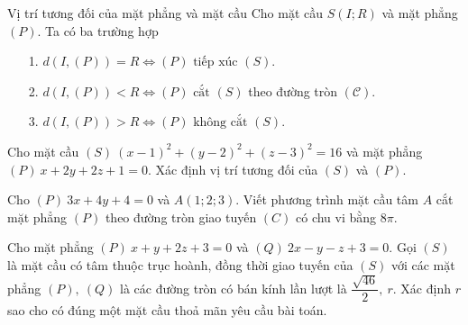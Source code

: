 \begin{dang}{Vị trí tương đối của mặt phẳng và mặt cầu}
	Cho mặt cầu $ S(I;R) $ và mặt phẳng $ (P) $. 
	Ta có ba trường hợp 
	\begin{itemize}
		\item[1.] $ d(I,(P)) = R \Leftrightarrow (P) \textrm{ tiếp xúc } (S) $.
		\item[2.] $ d(I,(P)) < R \Leftrightarrow (P) \textrm{ cắt } (S) $ theo 	đường tròn  $(\mathscr{C})  $.
		\item[3.] $ d(I,(P)) > R \Leftrightarrow (P) \text{ không cắt } (S) $.
	\end{itemize}	
\end{dang}
\begin{vd}%
	Cho mặt cầu $ (S) \ (x-1)^2 + (y-2)^2 + (z-3)^2 = 16 $ và mặt phẳng $ (P) \ x + 2y + 2z + 1 = 0  $. Xác định vị trí tương đối của $ (S) $ và $ (P) $.	

\end{vd}
\begin{vd}%
	Cho $ (P) \ 3x + 4y  + 4 = 0 $ và $ A(1;2;3) $. Viết phương trình mặt cầu tâm $ A $ cắt mặt phẳng $ (P) $ theo đường tròn giao tuyến $ (C) $ có chu vi bằng $ 8 \pi $.

\end{vd}
\begin{vd}%
	Cho mặt phẳng $ (P) \ x + y + 2z + 3 =0 $ và $ (Q) \ 2x - y - z + 3 = 0 $. Gọi $ (S) $ là mặt cầu có tâm thuộc trục hoành, đồng thời giao tuyến của $ (S) $ với các mặt phẳng $ (P), \ (Q) $ là các đường tròn có bán kính lần lượt là $ \dfrac{\sqrt{46}}{2}, \ r $. Xác định $ r $  sao cho có đúng một mặt cầu thoả mãn yêu cầu bài toán.

\end{vd}		
